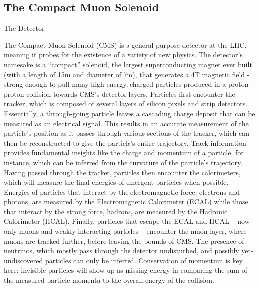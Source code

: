 \documentclass[oneside,12pt,final]{sty/ucthesis-CA2012}
\begin{document}
\begin{mainmatter}
\chapter{The Compact Muon Solenoid}{\label{appendix:a}}
\begin{section}{The Detector}

The Compact Muon Solenoid (CMS) is a general purpose detector at the LHC, meaning it probes for the existence of a variety of new physics. The detector's namesake is a ``compact'' solenoid, the largest superconducting magnet ever built (with a length of 15m and diameter of 7m\cite{CMS:1994hea}), that generates a 4T magnetic field - strong enough to pull many high-energy, charged particles produced in a proton-proton collision towards CMS's detector layers. Particles first encounter the tracker, which is composed of several layers of silicon pixels and strip detectors. Essentially, a through-going particle leaves a cascading charge deposit that can be measured as an electrical signal. This results in an accurate measurement of the particle's position as it passes through various sections of the tracker, which can then be reconstructed to give the particle's entire trajectory. Track information provides fundamental insights like the charge and momentum of a particle, for instance, which can be inferred from the curvature of the particle's trajectory. Having passed through the tracker, particles then encounter the calorimeters, which will measure the final energies of emergent particles when possible. Energies of particles that interact by the electromagnetic force, electrons and photons, are measured by the Electromagnetic Calorimeter (ECAL) while those that interact by the strong force, hadrons, are measured by the Hadronic Calorimeter (HCAL). Finally, particles that escape the ECAL and HCAL -- now only muons and weakly interacting particles -- encounter the muon layer, where muons are tracked further, before leaving the bounds of CMS. The presence of neutrinos, which mostly pass through the detector undisturbed, and possibly yet-undiscovered particles can only be inferred. Conservation of momentum is key here: invisible particles will show up as missing energy in comparing the sum of the measured particle momenta to the overall energy of the collision.


\end{section}
\end{mainmatter}
\end{document}
